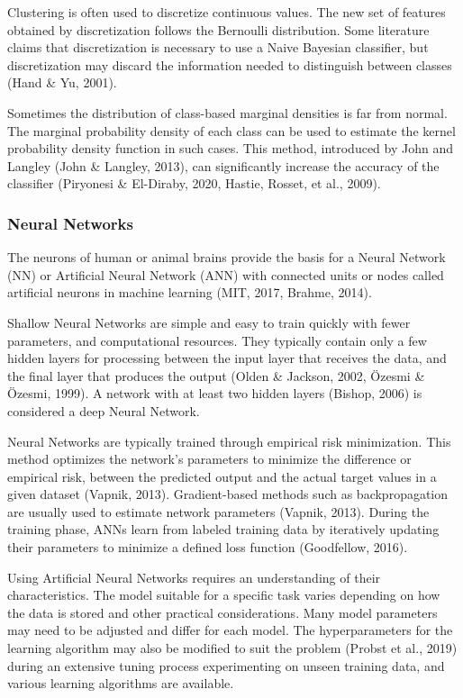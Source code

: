 \documentclass[sn-mathphys-num]{sn-jnl}%
\begin{document}
Clustering is often used to discretize continuous values. The new set of features obtained by discretization follows the Bernoulli distribution. Some literature claims that discretization is necessary to use a Naive Bayesian classifier, but discretization may discard the information needed to distinguish between classes (Hand & Yu, 2001).

Sometimes the distribution of class-based marginal densities is far from normal. The marginal probability density of each class can be used to estimate the kernel probability density function in such cases. This method, introduced by John and Langley (John & Langley, 2013), can significantly increase the accuracy of the classifier (Piryonesi & El-Diraby, 2020, Hastie, Rosset, et al., 2009).

\subsubsection{Neural Networks}

The neurons of human or animal brains provide the basis for a Neural Network (NN) or Artificial Neural Network (ANN) with connected units or nodes called artificial neurons in machine learning (MIT, 2017, Brahme, 2014). 

Shallow Neural Networks are simple and easy to train quickly with fewer parameters, and computational resources. They typically contain only a few hidden layers for processing between the input layer that receives the data, and the final layer that produces the output (Olden & Jackson, 2002, Özesmi & Özesmi, 1999).  A network with at least two hidden layers (Bishop, 2006) is considered a deep Neural Network.

Neural Networks are typically trained through empirical risk minimization. This method optimizes the network's parameters to minimize the difference or empirical risk, between the predicted output and the actual target values in a given dataset (Vapnik, 2013). Gradient-based methods such as backpropagation are usually used to estimate network parameters  (Vapnik, 2013). During the training phase, ANNs learn from labeled training data by iteratively updating their parameters to minimize a defined loss function (Goodfellow, 2016).

Using Artificial Neural Networks requires an understanding of their characteristics. The model suitable for a specific task varies depending on how the data is stored and other practical considerations. Many model parameters may need to be adjusted and differ for each model. The hyperparameters for the learning algorithm may also be modified to suit the problem (Probst et al., 2019) during an extensive tuning process experimenting on unseen training data, and various learning algorithms are available.
\end{document}
